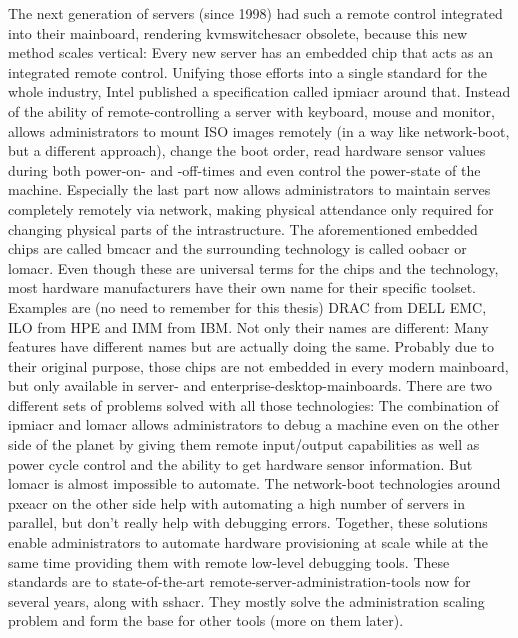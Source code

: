 The next generation of servers (since 1998) had such a remote control integrated into their mainboard, rendering \gls{kvmswitchesacr} obsolete, because this new method scales vertical: Every new server has an embedded chip that acts as an integrated remote control. Unifying those efforts into a single standard for the whole industry, Intel published a specification called \gls{ipmiacr} around that. Instead of  the ability of remote-controlling a server with keyboard, mouse and monitor,  allows administrators to mount ISO images remotely (in a way like network-boot, but a different approach), change the boot order, read hardware sensor values during both power-on- and -off-times and even control the power-state of the machine. Especially the last part now allows administrators to maintain serves completely remotely via network, making physical attendance only required for changing physical parts of the intrastructure. The aforementioned embedded chips are called \gls{bmcacr} and the surrounding technology is called \gls{oobacr} or \gls{lomacr}. Even though these are universal terms for the chips and the technology, most hardware manufacturers have their own name for their specific toolset. Examples are (no need to remember for this thesis) DRAC from DELL EMC, ILO from HPE and IMM from IBM. Not only their names are different: Many features have different names but are actually doing the same. Probably due to their original purpose, those chips are not embedded in every modern mainboard, but only available in server- and enterprise-desktop-mainboards.
\newline
There are two different sets of problems solved with all those technologies:
The combination of \gls{ipmiacr} and \gls{lomacr} allows administrators to debug a machine even on the other side of the planet by giving them remote input/output capabilities as well as power cycle control and the ability to get hardware sensor information. But \gls{lomacr} is almost impossible to automate. %
The network-boot technologies around \gls{pxeacr} on the other side help with automating a high number of servers in parallel, but don't really help with debugging errors.
\newline
Together, these solutions enable administrators to automate hardware provisioning at scale while at the same time providing them with remote low-level debugging tools.
\newline
These standards are to state-of-the-art remote-server-administration-tools now for several years, along with \gls{sshacr}. They mostly solve the administration scaling problem and form the base for other tools (more on them later). %
